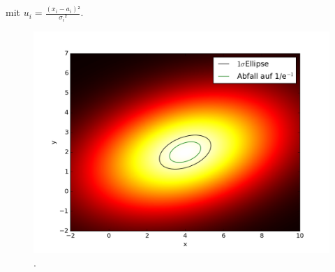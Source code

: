 \begin{itemize}
mit $u_i=\frac{(x_i-a_i)²}{{\sigma_i}²}$. 

\begin{figure}
\centering
\includegraphics[width=\textwidth]{plot_4b.png}
\caption{.}
\end{figure}


\end{itemize}
